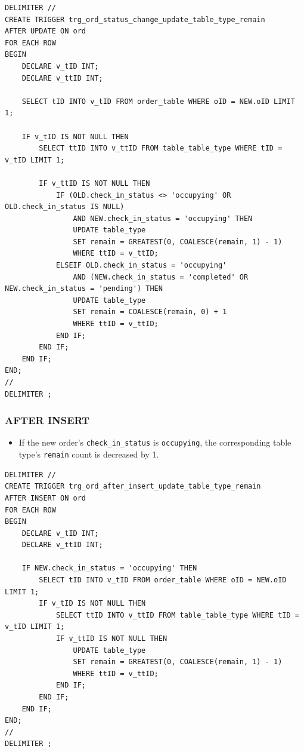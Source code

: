 \documentclass[12pt]{article}
\begin{document}
\begin{lstlisting}
DELIMITER //
CREATE TRIGGER trg_ord_status_change_update_table_type_remain
AFTER UPDATE ON ord
FOR EACH ROW
BEGIN
    DECLARE v_tID INT;
    DECLARE v_ttID INT;

    SELECT tID INTO v_tID FROM order_table WHERE oID = NEW.oID LIMIT 1;

    IF v_tID IS NOT NULL THEN
        SELECT ttID INTO v_ttID FROM table_table_type WHERE tID = v_tID LIMIT 1;

        IF v_ttID IS NOT NULL THEN
            IF (OLD.check_in_status <> 'occupying' OR OLD.check_in_status IS NULL)
                AND NEW.check_in_status = 'occupying' THEN
                UPDATE table_type
                SET remain = GREATEST(0, COALESCE(remain, 1) - 1)
                WHERE ttID = v_ttID;
            ELSEIF OLD.check_in_status = 'occupying'
                AND (NEW.check_in_status = 'completed' OR NEW.check_in_status = 'pending') THEN
                UPDATE table_type
                SET remain = COALESCE(remain, 0) + 1
                WHERE ttID = v_ttID;
            END IF;
        END IF;
    END IF;
END;
//
DELIMITER ;
\end{lstlisting}

\subsubsection*{AFTER INSERT}
\begin{itemize}
    \item If the new order's \texttt{check\_in\_status} is \texttt{occupying}, the corresponding table type's \texttt{remain} count is decreased by 1.
\end{itemize}
\begin{lstlisting}
DELIMITER //
CREATE TRIGGER trg_ord_after_insert_update_table_type_remain
AFTER INSERT ON ord
FOR EACH ROW
BEGIN
    DECLARE v_tID INT;
    DECLARE v_ttID INT;

    IF NEW.check_in_status = 'occupying' THEN
        SELECT tID INTO v_tID FROM order_table WHERE oID = NEW.oID LIMIT 1;
        IF v_tID IS NOT NULL THEN
            SELECT ttID INTO v_ttID FROM table_table_type WHERE tID = v_tID LIMIT 1;
            IF v_ttID IS NOT NULL THEN
                UPDATE table_type
                SET remain = GREATEST(0, COALESCE(remain, 1) - 1)
                WHERE ttID = v_ttID;
            END IF;
        END IF;
    END IF;
END;
//
DELIMITER ;
\end{lstlisting}
\end{document}
